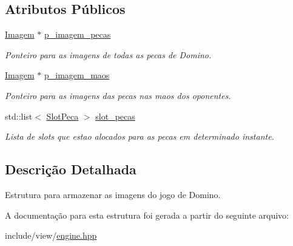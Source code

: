\subsection*{Atributos Públicos}
\begin{DoxyCompactItemize}
\item 
\hypertarget{structsJogo_a14eba75e0169544f9ae6ad594c50cfbb}{
\hyperlink{classImagem}{Imagem} $\ast$ \hyperlink{structsJogo_a14eba75e0169544f9ae6ad594c50cfbb}{p\_\-imagem\_\-pecas}}
\label{structsJogo_a14eba75e0169544f9ae6ad594c50cfbb}

\begin{DoxyCompactList}\small\item\em Ponteiro para as imagens de todas as pecas de Domino. \item\end{DoxyCompactList}\item 
\hypertarget{structsJogo_a59d3593b054f3fcca11707fb45e82929}{
\hyperlink{classImagem}{Imagem} $\ast$ \hyperlink{structsJogo_a59d3593b054f3fcca11707fb45e82929}{p\_\-imagem\_\-maos}}
\label{structsJogo_a59d3593b054f3fcca11707fb45e82929}

\begin{DoxyCompactList}\small\item\em Ponteiro para as imagens das pecas nas maos dos oponentes. \item\end{DoxyCompactList}\item 
\hypertarget{structsJogo_ac5497fb8f57d71436f53b6ce45748b3b}{
std::list$<$ \hyperlink{classSlotPeca}{SlotPeca} $>$ \hyperlink{structsJogo_ac5497fb8f57d71436f53b6ce45748b3b}{slot\_\-pecas}}
\label{structsJogo_ac5497fb8f57d71436f53b6ce45748b3b}

\begin{DoxyCompactList}\small\item\em Lista de slots que estao alocados para as pecas em determinado instante. \item\end{DoxyCompactList}\end{DoxyCompactItemize}


\subsection{Descrição Detalhada}
Estrutura para armazenar as imagens do jogo de Domino. 

A documentação para esta estrutura foi gerada a partir do seguinte arquivo:\begin{DoxyCompactItemize}
\item 
include/view/\hyperlink{engine_8hpp}{engine.hpp}\end{DoxyCompactItemize}

